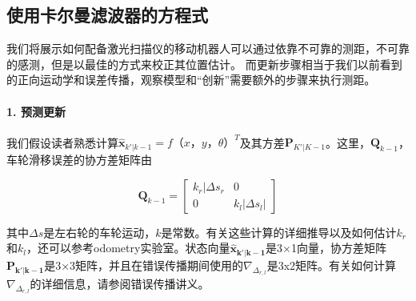 \subsection{使用卡尔曼滤波器的方程式}
我们将展示如何配备激光扫描仪的移动机器人可以通过依靠不可靠的测距，不可靠的感测，但是以最佳的方式来校正其位置估计。
而更新步骤相当于我们以前看到的正向运动学和误差传播，观察模型和“创新”需要额外的步骤来执行测距。


\paragraph{1. 预测更新}
我们假设读者熟悉计算$\hat{\boldsymbol{x}}_{k'|k-1}=f（x，y，θ）^T$及其方差$\boldsymbol{P}_{K'|K-1}$。这里，$\boldsymbol{Q}_{k-1}$，车轮滑移误差的协方差矩阵由

\begin{equation}
\boldsymbol{Q}_{k-1}=\left[\begin{array}{cc}k_r|\Delta s_r & 0\\0 & k_l|\Delta s_l|\end{array}\right]
\end{equation}


其中$\Delta s$是左右轮的车轮运动，$k$是常数。有关这些计算的详细推导以及如何估计$k_r$和$k_l$，还可以参考odometry实验室。状态向量$\boldsymbol{\hat{x}_{k'|k-1}}$是3×1向量，协方差矩阵$\boldsymbol{P_{k'|k-1}}$是3×3矩阵，并且在错误传播期间使用的$\nabla_{\Delta_{r,l}}$是3x2矩阵。有关如何计算$\nabla_{\Delta_{r,l}}$的详细信息，请参阅错误传播讲义。

